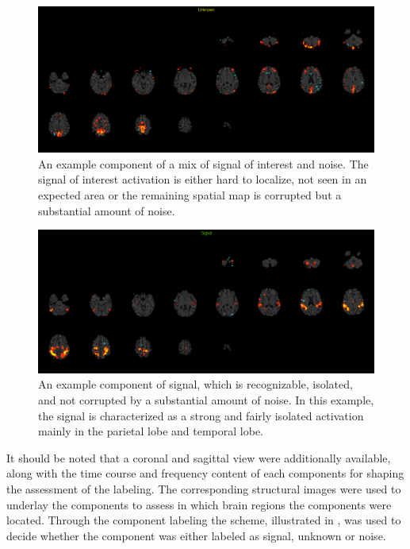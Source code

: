\begin{figure}[H]                 
	\includegraphics[width=.85\textwidth]{figures/bMethods/unknown}  
	\caption{An example component of a mix of signal of interest and noise. The signal of interest activation is either hard to localize, not seen in an expected area or the remaining spatial map is corrupted but a substantial amount of noise.}
	\label{fig:meth:unknown} 
\end{figure}

\begin{figure}[H]                 
	\includegraphics[width=.85\textwidth]{figures/bMethods/signal}  
	\caption{An example component of signal, which is recognizable, isolated, and not corrupted by a substantial amount of noise. In this example, the signal is characterized as a strong and fairly isolated activation mainly in the parietal lobe and temporal lobe.}
	\label{fig:meth:signal} 
\end{figure}




It should be noted that a coronal and sagittal view were additionally available, along with the time course and frequency content of each components for shaping the assessment of the labeling. The corresponding structural images were used to underlay the components to assess in which brain regions the components were located. Through the component labeling the scheme, illustrated in , was used to decide whether the component was either labeled as signal, unknown or noise. 
 
